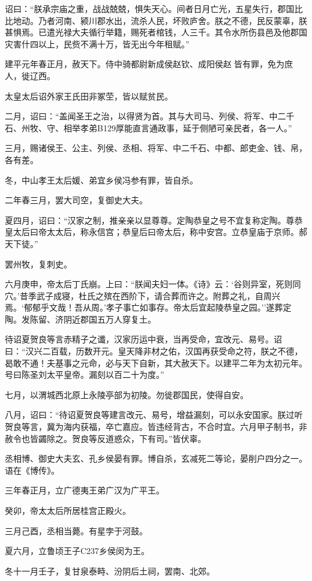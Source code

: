 \documentclass[]{article}
\begin{document}
诏曰：``朕承宗庙之重，战战兢兢，惧失天心。间者日月亡光，五星失行，郡国比比地动。乃者河南、颍川郡水出，流杀人民，坏败庐舍。朕之不德，民反蒙辜，朕甚惧焉。已遣光禄大夫循行举籍，赐死者棺钱，人三千。其令水所伤县邑及他郡国灾害什四以上，民赀不满十万，皆无出今年租赋。''

建平元年春正月，赦天下。侍中骑都尉新成侯赵钦、成阳侯赵皆有罪，免为庶人，徙辽西。

太皇太后诏外家王氏田非冢茔，皆以赋贫民。

二月，诏曰：``盖闻圣王之治，以得贤为首。其与大司马、列侯、将军、中二千石、州牧、守、相举孝弟B129厚能直言通政事，延于侧陋可亲民者，各一人。''

三月，赐诸侯王、公主、列侯、丞相、将军、中二千石、中都、郎吏金、钱、帛，各有差。

冬，中山孝王太后媛、弟宜乡侯冯参有罪，皆自杀。

二年春三月，罢大司空，复御史大夫。

夏四月，诏曰：``汉家之制，推亲亲以显尊尊。定陶恭皇之号不宜复称定陶。尊恭皇太后曰帝太太后，称永信宫；恭皇后曰帝太后，称中安宫。立恭皇庙于京师。郝天下徒。''

罢州牧，复刺史。

六月庚申，帝太后丁氏崩。上曰：``朕闻夫妇一体。《诗》云：`谷则异室，死则同穴。'昔季武子成寝，杜氏之殡在西阶下，请合葬而许之。附葬之礼，自周兴焉。`郁郁乎文哉！吾从周。'孝子事亡如事存。帝太后宜起陵恭皇之园。''遂葬定陶。发陈留、济阴近郡国五万人穿复土。

待诏夏贺良等言赤精子之谶，汉家历运中衰，当再受命，宜改元、易号。诏曰：``汉兴二百载，历数开元。皇天降非材之佑，汉国再获受命之符，朕之不德，曷敢不通！夫基事之元命，必与天下自新，其大赦天下。以建平二年为太初元年。号曰陈圣刘太平皇帝。漏刻以百二十为度。''

七月，以渭城西北原上永陵亭部为初陵。勿徙郡国民，使得自安。

八月，诏曰：``待诏夏贺良等建言改元、易号，增益漏刻，可以永安国家。朕过听贺良等言，冀为海内获福，卒亡嘉应。皆违经背古，不合时宜。六月甲子制书，非赦令也皆蠲除之。贺良等反道惑众，下有司。''皆伏辜。

丞相博、御史大夫玄、孔乡侯晏有罪。博自杀，玄减死二等论，晏削户四分之一。语在《博传》。

三年春正月，立广德夷王弟广汉为广平王。

癸卯，帝太太后所居桂宫正殿火。

三月己酉，丞相当薨。有星孛于河鼓。

夏六月，立鲁顷王子C237乡侯闵为王。

冬十一月壬子，复甘泉泰畤、汾阴后土祠，罢南、北郊。
\end{document}
